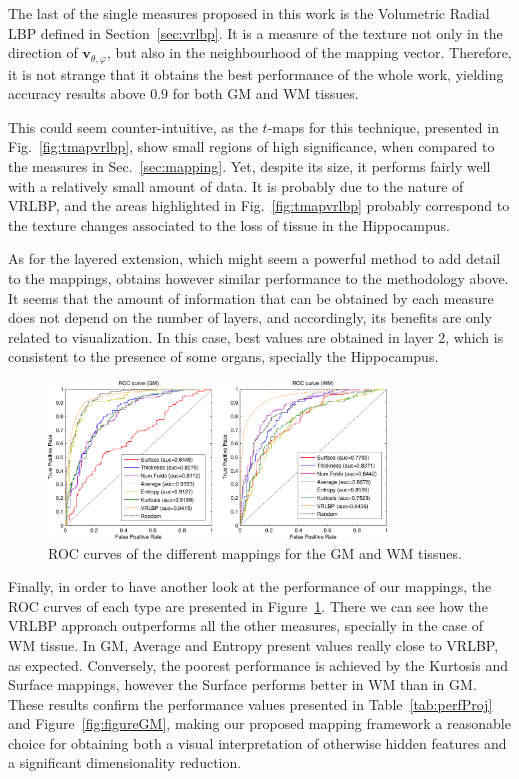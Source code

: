 The last of the single measures proposed in this work is the Volumetric Radial LBP defined in Section~\ref{sec:vrlbp}. It is a measure of the texture not only in the direction of $\mathbf{v}_{\theta,\varphi}$, but also in the neighbourhood of the mapping vector. Therefore, it is not strange that it obtains the best performance of the whole work, yielding accuracy results above $0.9$ for both \ac{GM} and \ac{WM} tissues. 

This could seem counter-intuitive, as the $t$-maps for this technique, presented in Fig.~\ref{fig:tmapvrlbp}, show small regions of high significance, when compared to the measures in Sec.~\ref{sec:mapping}. Yet, despite its size, it performs fairly well with a relatively small amount of data. It is probably due to the nature of VRLBP, and the areas highlighted in Fig.~\ref{fig:tmapvrlbp} probably correspond to the texture changes associated to the loss of tissue in the Hippocampus. 

As for the layered extension, which might seem a powerful method to add detail to the mappings, obtains however similar performance to the methodology above. It seems that the amount of information that can be obtained by each measure does not depend on the number of layers, and accordingly, its benefits are only related to visualization. In this case, best values are obtained in layer 2, which is consistent to the presence of some organs, specially the Hippocampus.  

\begin{figure}[htp]%
	\centering
	\includegraphics[width=0.8\textwidth]{gfx/ch6/13-ROC}
	
	\caption{ROC curves of the different mappings for the \ac{GM} and \ac{WM} tissues.}
	\label{fig:roc}
\end{figure}

Finally, in order to have another look at the performance of our mappings, the ROC curves of each type are presented in Figure~\ref{fig:roc}. There we can see how the VRLBP approach outperforms all the other measures, specially in the case of \ac{WM} tissue. In \ac{GM}, Average and Entropy present values really close to VRLBP, as expected. Conversely, the poorest performance is achieved by the Kurtosis and Surface mappings, however the Surface performs better in \ac{WM} than in \ac{GM}. These results confirm the performance values presented in  Table~\ref{tab:perfProj} and Figure~\ref{fig:figureGM}, making our proposed mapping framework a reasonable choice for obtaining both a visual interpretation of otherwise hidden features and a significant dimensionality reduction. 

